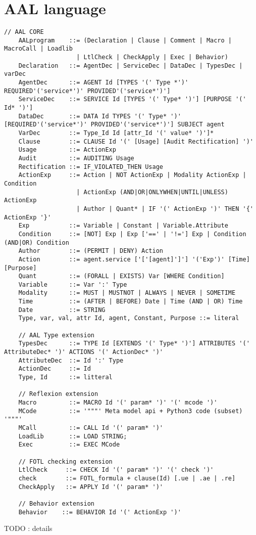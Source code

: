\section{AAL language}
\begin{lstlisting}[caption={AAL Syntax}, label=syntax]
    // AAL CORE
    AALprogram    ::= (Declaration | Clause | Comment | Macro | MacroCall | Loadlib
                    | LtlCheck | CheckApply | Exec | Behavior)
    Declaration   ::= AgentDec | ServiceDec | DataDec | TypesDec | varDec
    AgentDec      ::= AGENT Id [TYPES '(' Type *')' REQUIRED'('service*')' PROVIDED'('service*')']
    ServiceDec    ::= SERVICE Id [TYPES '(' Type* ')'] [PURPOSE '(' Id* ')']
    DataDec       ::= DATA Id TYPES '(' Type* ')' [REQUIRED'('service*')' PROVIDED'('service*')'] SUBJECT agent
    VarDec        ::= Type_Id Id [attr_Id '(' value* ')']*
    Clause        ::= CLAUSE Id '(' [Usage] [Audit Rectification] ')'
    Usage         ::= ActionExp
    Audit         ::= AUDITING Usage
    Rectification ::= IF_VIOLATED_THEN Usage
    ActionExp     ::= Action | NOT ActionExp | Modality ActionExp | Condition
                    | ActionExp (AND|OR|ONLYWHEN|UNTIL|UNLESS) ActionExp
                    | Author | Quant* | IF '(' ActionExp ')' THEN '{' ActionExp '}'
    Exp           ::= Variable | Constant | Variable.Attribute
    Condition     ::= [NOT] Exp | Exp ['==' | '!='] Exp | Condition (AND|OR) Condition
    Author        ::= (PERMIT | DENY) Action
    Action        ::= agent.service ['['[agent]']'] '('Exp')' [Time] [Purpose]
    Quant         ::= (FORALL | EXISTS) Var [WHERE Condition]
    Variable      ::= Var ':' Type
    Modality      ::= MUST | MUSTNOT | ALWAYS | NEVER | SOMETIME
    Time          ::= (AFTER | BEFORE) Date | Time (AND | OR) Time
    Date          ::= STRING
    Type, var, val, attr Id, agent, Constant, Purpose ::= literal

    // AAL Type extension
    TypesDec      ::= TYPE Id [EXTENDS '(' Type* ')'] ATTRIBUTES '(' AttributeDec* ')' ACTIONS '(' ActionDec* ')'
    AttributeDec  ::= Id ':' Type
    ActionDec     ::= Id
    Type, Id      ::= litteral

    // Reflexion extension
    Macro         ::= MACRO Id '(' param* ')' '(' mcode ')'
    MCode         ::= '"""' Meta model api + Python3 code (subset) '"""'
    MCall         ::= CALL Id '(' param* ')'
    LoadLib       ::= LOAD STRING;
    Exec          ::= EXEC MCode

    // FOTL checking extension
    LtlCheck     ::= CHECK Id '(' param* ')' '(' check ')'
    check        ::= FOTL_formula + clause(Id) [.ue | .ae | .re]
    CheckApply   ::= APPLY Id '(' param* ')'

    // Behavior extension
    Behavior    ::= BEHAVIOR Id '(' ActionExp ')'

\end{lstlisting}

TODO : details
